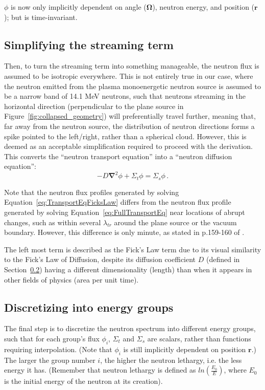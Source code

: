 \documentclass[a4paper, 12pt]{article}
\newcommand{\ve}[1]{\boldsymbol{#1}}
\begin{document}
$\phi$ is now only implicitly dependent on angle ($\ve{\Omega}$), neutron energy, and position ($\ve{r}$); but is time-invariant.

\subsection{Simplifying the streaming term}
Then, to turn the streaming term into something manageable, the neutron flux is assumed to be isotropic everywhere.
This is not entirely true in our case, where the neutron emitted from the plasma monoenergetic neutron source is assumed to be a narrow band of 14.1 MeV neutrons, such that neutrons streaming in the horizontal direction (perpendicular to the plane source in Figure~\ref{fig:collapsed_geometry}) will preferentially travel further, meaning that, far away from the neutron source, the distribution of neutron directions forms a spike pointed to the left/right, rather than a spherical cloud. However, this is deemed as an acceptable simplification required to proceed with the derivation.
This converts the ``neutron transport equation'' into a ``neutron diffusion equation'':
\begin{equation}\label{eq:TransportEqFicksLaw}
    -D\ve{\nabla}^2\phi + \Sigma_t \phi =\Sigma_s \phi\,.
\end{equation}

Note that the neutron flux profiles generated by solving Equation~\ref{eq:TransportEqFicksLaw} differs from the neutron flux profile generated by solving Equation~\ref{eq:FullTransportEq} near locations of abrupt changes, such as within several $\lambda_{tr}$ around the plane source or the vacuum boundary. However, this difference is only minute, as stated in p.159-160 of \cite{Duderstadt}.

The left most term is described as the Fick's Law term due to its visual similarity to the Fick's Law of Diffusion, despite its diffusion coefficient $D$ (defined in Section~\ref{sec:discretize}) having a different dimensionality (length) than when it appears in other fields of physics (area per unit time).

\subsection{Discretizing into energy groups}\label{sec:discretize}
The final step is to discretize the neutron spectrum into different energy groups, such that for each group's flux $\phi_i$, $\Sigma_t$ and $\Sigma_s$ are scalars, rather than functions requiring interpolation. (Note that $\phi_i$ is still implicitly dependent on position $\ve{r}$.) The larger the group number $i$, the higher the neutron lethargy, i.e. the less energy it has. (Remember that neutron lethargy is defined as $ln(\frac{E_0}{E})$, where $E_0$ is the initial energy of the neutron at its creation).
\end{document}
